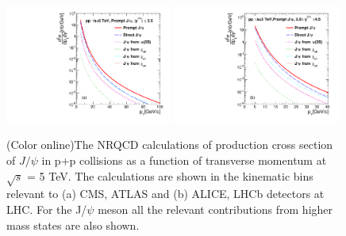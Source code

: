 \documentclass[aps,prc,preprint,superscriptaddress,showpacs,showkeys,amsmath]{revtex4-1}
\begin{document}
\begin{figure}
\includegraphics[width=0.49\textwidth]{Fig9a_ATLAS_D2NDPtDy_RootS5TeV_PromptJPsi_Y2525.pdf}
\includegraphics[width=0.49\textwidth]{Fig9b_ALICE_D2NDPtDy_RootS5TeV_PromptJPsi_Y2045.pdf}
\caption{(Color online)The NRQCD calculations of production cross section of $J/\psi$ in p+p collisions 
  as a function of transverse momentum at $\sqrt{s}$ = 5 TeV. The calculations are shown in the kinematic
  bins relevant to (a) CMS, ATLAS and (b) ALICE, LHCb detectors at LHC. For the J/$\psi$ meson all the 
  relevant contributions from higher mass states are also shown.
}
\label{Fig:SigmaJPsi5TeV}
\end{figure}





\end{document}

